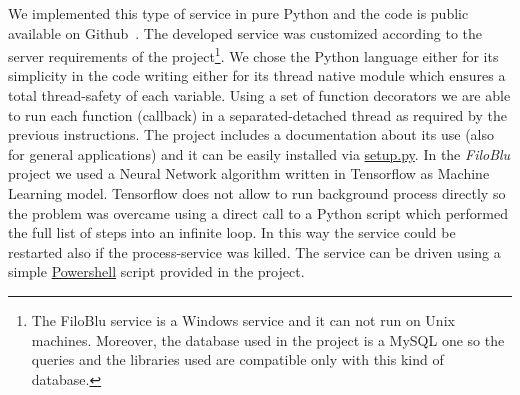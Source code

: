 \documentclass{standalone}
\begin{document}
We implemented this type of service in pure \textsf{Python} and the code is public available on Github~\cite{FiloBlu}.
The developed service was customized according to the server requirements of the project\footnote{
  The FiloBlu service is a Windows service and it can not run on Unix machines.
  Moreover, the database used in the project is a \textsf{MySQL} one so the queries and the libraries used are compatible only with this kind of database.
}.
We chose the \textsf{Python} language either for its simplicity in the code writing either for its thread native module which ensures a total thread-safety of each variable.
Using a set of function decorators we are able to run each function (\textsf{callback}) in a separated-detached thread as required by the previous instructions.
The project includes a documentation about its use (also for general applications) and it can be easily installed via \href{https://github.com/Nico-Curti/FiloBluService/blob/master/setup.py}{\textsf{setup.py}}.
In the \emph{FiloBlu} project we used a Neural Network algorithm written in \textsf{Tensorflow} as Machine Learning model.
\textsf{Tensorflow} does not allow to run background process directly so the problem was overcame using a direct call to a \textsf{Python} script which performed the full list of steps into an infinite loop.
In this way the service could be restarted also if the process-service was killed.
The service can be driven using a simple \href{https://github.com/Nico-Curti/FiloBluService/blob/master/filobluservice.ps1}{\textsf{Powershell}} script provided in the project.
\end{document}
